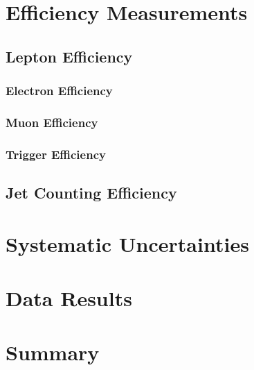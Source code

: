 \documentclass{cmspaper}
\begin{document}
\section{Efficiency Measurements}
     \label{sec:alleff}
     \subsection{Lepton Efficiency}
     \label{sec:efficiency}
%     
	 \subsubsection{Electron Efficiency}
	 \label{sec:eff_electron}
%	 
	 \subsubsection{Muon Efficiency}
	 \label{sec:eff_muon}
%	 
	 \subsubsection{Trigger Efficiency}
	 \label{sec:eff_trigger}
%	 
     \subsection{Jet Counting Efficiency}
%     

\section{Systematic Uncertainties}
   \label{sec:systematics}
%   

\clearpage
\section{Data Results}
   \label{sec:dataresults}
%   

\section{Summary}
     \label{sec:summary}
%     

\clearpage
%

\clearpage 
\appendix
\appendixpage
\end{document}
